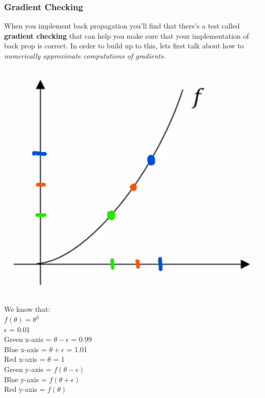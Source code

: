 \documentclass[11pt, a4paper]{article}
\begin{document}
\begin{spacing}{1.1}
	\subsubsection{Gradient Checking}
	When you implement back propagation you'll find that there's a test called \textbf{gradient checking} that can help you make sure that your implementation of back prop is correct. In order to build up to this, lets first talk about how to \textit{numerically approximate computations of gradients}. \vspace*{1mm} \\
	\begin{minipage}[c]{7cm}
	\includegraphics[scale=.4]{num_grad_check}
	\end{minipage}
	\begin{minipage}[c]{9cm}
	We know that: \\
	$f(\theta) = \theta^3$ \\ $\epsilon$ = 0.01 \\ Green x-axis = $\theta - \epsilon$ = 0.99 \\ Blue x-axis = $\theta + \epsilon$ = 1.01 \\ Red x-axis = $\theta$ = 1 \\ Green y-axis = $f(\theta-\epsilon)$ \\ Blue y-axis = $f(\theta+\epsilon)$ \\ Red y-axis = $f(\theta)$
	\end{minipage} \\

\end{spacing}
\end{document}
